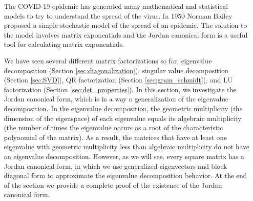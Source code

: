  \label{sec:JCF}

\vspace*{-17 pt}

\vspace*{13 pt}


The COVID-19 epidemic has generated many mathematical and statistical models to try to understand the spread of the virus. In 1950 Norman Bailey proposed a simple stochastic model of the spread of an epidemic. The solution to the model involves matrix exponentials and the Jordan canonical form is a useful tool for calculating matrix exponentials. 



We have seen several different matrix factorizations so far, eigenvalue decomposition (Section \ref{sec:diagonalization}), singular value decomposition (Section \ref{sec:SVD}), QR factorization (Section \ref{sec:gram_schmidt}), and LU factorization (Section \ref{sec:det_properties}). In this section, we investigate the Jordan canonical form, which is in a way a generalization of the eigenvalue decomposition. In the eigenvalue decomposition, the geometric multiplicity (the dimension of the eigenspace) of each eigenvalue equals its algebraic multiplicity (the number of times the eigenvalue occurs as a root of the characteristic polynomial of the matrix). As a result, the matrices that have at least one eigenvalue with geometric multiplicity less than algebraic multiplicity do not have an eigenvalue decomposition. However, as we will see, every square matrix has a Jordan canonical form, in which we use generalized eigenvectors and block diagonal form to approximate the eigenvalue decomposition behavior. At the end of the section we provide a complete proof of the existence of the Jordan canonical form. 

